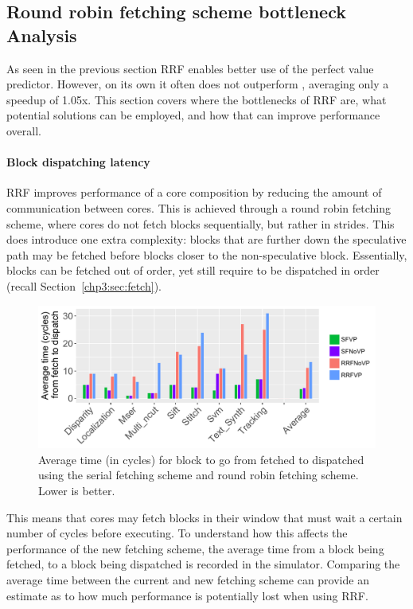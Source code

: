\subsection{Round robin fetching scheme bottleneck Analysis}

As seen in the previous section RRF enables better use of the perfect value predictor. 
However, on its own it often does not outperform \novp{}, averaging only a speedup of 1.05x.
This section covers where the bottlenecks of RRF are, what potential solutions can be employed, and how that can improve performance overall.

\paragraph*{Block dispatching latency}

RRF improves performance of a core composition by reducing the amount of communication between cores.
This is achieved through a round robin fetching scheme, where cores do not fetch blocks sequentially, but rather in strides.
This does introduce one extra complexity: blocks that are further down the speculative path may be fetched before blocks closer to the non-speculative block.
Essentially, blocks can be fetched out of order, yet still require to be dispatched in order (recall Section~\ref{chp3:sec:fetch}).

\begin{figure}[t]
    \centering
    \includegraphics[width=1\textwidth]{chapter3/graphics/avTimeToFetch3.pdf}
    \caption{Average time (in cycles) for block to go from fetched to dispatched using the serial fetching scheme and round robin fetching scheme. Lower is better.}
    \label{fig:av_time}
	\vspace{1em}
\end{figure}

This means that cores may fetch blocks in their window that must wait a certain number of cycles before executing.
To understand how this affects the performance of the new fetching scheme, the average time from a block being fetched, to a block being dispatched is recorded in the simulator.
Comparing the average time between the current and new fetching scheme can provide an estimate as to how much performance is potentially lost when using RRF.

